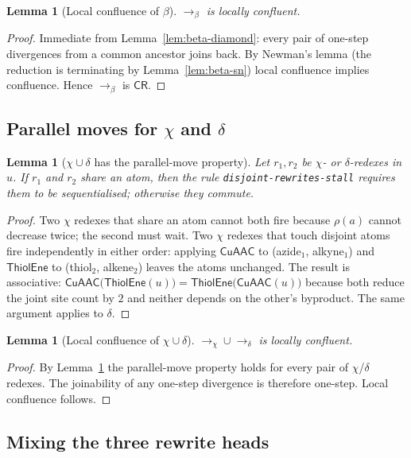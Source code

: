 \documentclass{article}
\newtheorem{lemma}[theorem]{Lemma}
\theoremstyle{definition}
\newcommand{\crprop}{\mathsf{CR}}
\newcommand{\stepsto}{\longrightarrow}
\newcommand{\stepstoBeta}{\longrightarrow_{\beta}}
\newcommand{\stepstoChem}{\longrightarrow_{\chi}}
\begin{document}
\begin{lemma}[Local confluence of $\beta$]
\label{lem:beta-lc}
$\stepstoBeta$ is locally confluent.
\end{lemma}
\begin{proof}
Immediate from Lemma~\ref{lem:beta-diamond}: every pair of one-step
divergences from a common ancestor joins back. By Newman's lemma (the
reduction is terminating by Lemma~\ref{lem:beta-sn}) local confluence
implies confluence. Hence $\stepstoBeta$ is $\crprop$.
\end{proof}

\subsection{Parallel moves for $\chi$ and $\delta$}

\begin{lemma}[$\chi \cup \delta$ has the parallel-move property]
\label{lem:chem-diamond}
Let $r_1, r_2$ be $\chi$- or $\delta$-redexes in $u$. If $r_1$ and $r_2$
share an atom, then the rule \texttt{disjoint-rewrites-stall} requires them
to be sequentialised; otherwise they commute.
\end{lemma}
\begin{proof}
Two $\chi$ redexes that share an atom cannot both fire because
$\rho(a)$ cannot decrease twice; the second must wait. Two $\chi$ redexes
that touch disjoint atoms fire independently in either order: applying
$\mathsf{CuAAC}$ to (azide$_1$, alkyne$_1$) and $\mathsf{ThiolEne}$ to
(thiol$_2$, alkene$_2$) leaves the atoms unchanged. The result is
associative: $\mathsf{CuAAC}\bigl(\mathsf{ThiolEne}(u)\bigr)
       = \mathsf{ThiolEne}\bigl(\mathsf{CuAAC}(u)\bigr)$
because both reduce the joint site count by $2$ and neither depends on
the other's byproduct. The same argument applies to $\delta$.
\end{proof}

\begin{lemma}[Local confluence of $\chi \cup \delta$]
\label{lem:chem-lc}
$\stepstoChem \cup \stepsto_\delta$ is locally confluent.
\end{lemma}
\begin{proof}
By Lemma~\ref{lem:chem-diamond} the parallel-move property holds for every
pair of $\chi$/$\delta$ redexes. The joinability of any one-step
divergence is therefore one-step. Local confluence follows.
\end{proof}

\subsection{Mixing the three rewrite heads}
\end{document}
